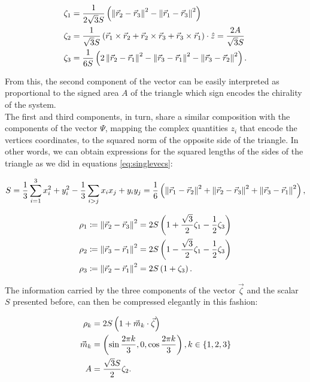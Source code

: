 \begin{align*}
\zeta_1 &= \frac{1}{2\sqrt{3}S}\left( \left\lVert \vec{r}_2 -\vec{r}_3 \right\rVert^2-\left\lVert \vec{r}_1 -\vec{r}_3 \right\rVert^2 \right)\\
\zeta_2 &= \frac{1}{\sqrt{3}S}\left( \vec{r}_1\times\vec{r}_2 + \vec{r}_2\times\vec{r}_3 +\vec{r}_3\times\vec{r}_1 \right)\cdot\hat{z} = \frac{2A}{\sqrt{3}S} \\
\zeta_3 &= \frac{1}{6S}\left( 2\left\lVert \vec{r}_2 -\vec{r}_1 \right\rVert^2-\left\lVert \vec{r}_3 -\vec{r}_1 \right\rVert^2-\left\lVert \vec{r}_3 -\vec{r}_2 \right\rVert^2 \right).
\end{align*}

From this, the second component of the vector can be easily interpreted as proportional to the signed area $A$ of the triangle which sign encodes the chirality of the system.\\

The first and third components, in turn, share a similar composition with the components of the vector $\Psi$, mapping the complex quantities $z_i$ that encode the vertices coordinates, to the squared norm of the opposite side of the triangle. In other words, we can obtain expressions for the squared lengths of the sides of the triangle as we did in equations \eqref{eq:singlevecs}:

\begin{align*}
S &= \frac{1}{3}\sum_{i=1}^3 x_i^2 + y_i^2 -\frac{1}{3}\sum_{i > j} x_ix_j + y_iy_j  = \frac{1}{6}\left( \left\lVert \vec{r}_1 -\vec{r}_2 \right\rVert^2+\left\lVert \vec{r}_2 -\vec{r}_3 \right\rVert^2+\left\lVert \vec{r}_3 -\vec{r}_1 \right\rVert^2 \right),\\
\end{align*}

\begin{equation}
\begin{aligned}
\rho_1 &\coloneqq \left\lVert \vec{r}_2 -\vec{r}_3 \right\rVert^2 = 2S\left( 1+\frac{\sqrt{3}}{2}\zeta_1-\frac{1}{2}\zeta_3 \right) \\
\rho_2 &\coloneqq \left\lVert \vec{r}_3 -\vec{r}_1 \right\rVert^2 = 2S\left( 1-\frac{\sqrt{3}}{2}\zeta_1-\frac{1}{2}\zeta_3 \right) \\
\rho_3 &\coloneqq \left\lVert \vec{r}_2 -\vec{r}_1 \right\rVert^2 = 2S\left( 1+\zeta_3 \right).
\end{aligned}
\label{eq:lados}
\end{equation}

The information carried by the three components of the vector $\vec{\zeta}$ and the scalar $S$ presented before, can then be compressed elegantly in this fashion:

\begin{equation}
\begin{aligned}
\rho_k &= 2S\left( 1+\vec{m}_k\cdot\vec{\zeta} \right)\\
\vec{m}_k &= \left( \sin{\frac{2\pi k}{3}},0,\cos{\frac{2\pi k}{3}} \right), k \in \left\lbrace 1,2, 3 \right\rbrace\\
A &= \frac{\sqrt{3}S}{2} \zeta_2.
\end{aligned}
\label{eq:compressed}
\end{equation}


